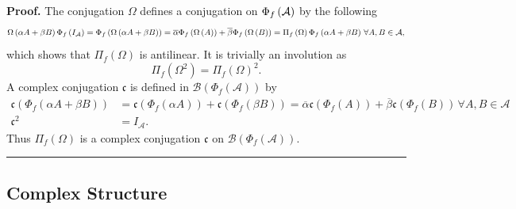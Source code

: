 \documentclass[aps,preprint]{revtex4}
\newenvironment{proof}[1][Proof]{\noindent\textbf{#1.} }{\ \rule{0.5em}{0.5em}}
\begin{document}
\begin{proof}
The conjugation $\Omega $ defines a conjugation on $\Phi _{f}\left( \mathcal{%
A}\right) $ by the following 
\begin{equation}
\Omega \left( \alpha A+\beta B\right) \Phi _{f}\left( I_{\mathcal{A}}\right)
=\Phi _{f}\left( \Omega \left( \alpha A+\beta B\right) \right) =\overline{%
\alpha }\Phi _{f}\left( \Omega \left( A\right) \right) +\overline{\beta }%
\Phi _{f}\left( \Omega \left( B\right) \right) =\Pi _{f}\left( \Omega
\right) \Phi _{f}\left( \alpha A+\beta B\right) \,\forall A,B\in \mathcal{A},
\end{equation}%
which shows that $\Pi _{f}\left( \Omega \right) $ is antilinear. It is
trivially an involution as 
\begin{equation}
\Pi _{f}\left( \Omega ^{2}\right) =\Pi _{f}\left( \Omega \right) ^{2}.
\end{equation}%
A complex conjugation $\mathfrak{c}$ is defined in $\mathcal{B}\left( \Phi
_{f}\left( \mathcal{A}\right) \right) $ by 
\begin{align}
\mathfrak{c}\left( \Phi _{f}\left( \alpha A+\beta B\right) \right) & =%
\mathfrak{c}\left( \Phi _{f}\left( \alpha A\right) \right) +\mathfrak{c}%
\left( \Phi _{f}\left( \beta B\right) \right) =\overline{\alpha }\mathfrak{c}%
\left( \Phi _{f}\left( A\right) \right) +\overline{\beta }\mathfrak{c}\left(
\Phi _{f}\left( B\right) \right) \,\forall A,B\in \mathcal{A} \\
\mathfrak{c}^{2}& =I_{\mathcal{A}}.
\end{align}%
Thus $\Pi _{f}\left( \Omega \right) $ is a complex conjugation $\mathfrak{c}$
on $\mathcal{B}\left( \Phi _{f}\left( \mathcal{A}\right) \right) .$
\end{proof}

\subsection{Complex Structure}
\end{document}
